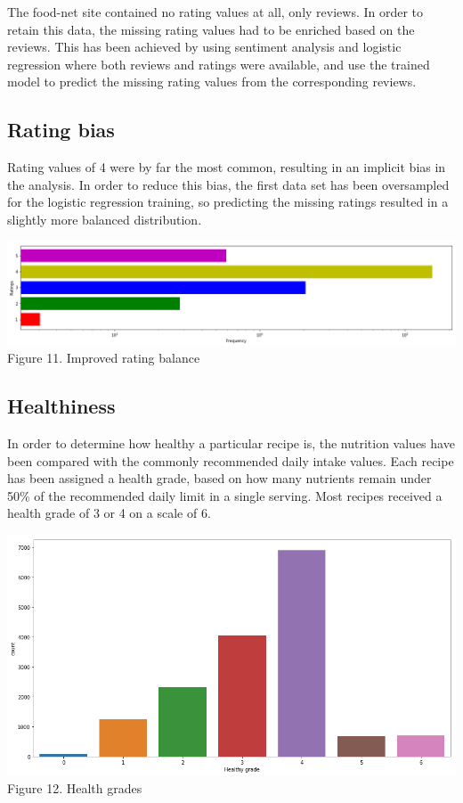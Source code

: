\documentclass[11pt]{article}
\begin{document}
The food-net site contained no rating values at all, only reviews. In order to retain this data, the missing rating values had to be enriched based on the reviews. This has been achieved by using sentiment analysis and logistic regression where both reviews and ratings were available, and use the trained model to predict the missing rating values from the corresponding reviews.

\subsection{Rating bias}

Rating values of 4 were by far the most common, resulting in an implicit bias in the analysis. In order to reduce this bias, the first data set has been oversampled for the logistic regression training, so predicting the missing ratings resulted in a slightly more balanced distribution.

\vspace{5mm}
\begin{center}
\includegraphics[scale=0.18]{rating-balanced}
\label{visalization-cookingtime} Figure 11. Improved rating balance
\end{center}
\vspace{5mm}

\subsection{Healthiness}

In order to determine how healthy a particular recipe is, the nutrition values have been compared with the commonly recommended daily intake values. Each recipe has been assigned a health grade, based on how many nutrients remain under 50\% of the recommended daily limit in a single serving. Most recipes received a health grade of 3 or 4 on a scale of 6.

\vspace{5mm}
\begin{center}
\includegraphics[scale=0.22]{health-grade}
\label{visalization-cookingtime} Figure 12. Health grades
\end{center}
\vspace{5mm}
\end{document}
